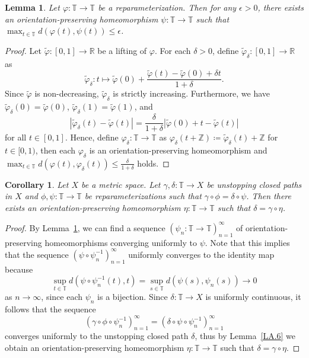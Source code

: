 \documentclass[reqno,centertags,12pt]{amsart}
\newtheorem{lemma}[theorem]{Lemma}
\newtheorem{corollary}[theorem]{Corollary}
\theoremstyle{definition}
\numberwithin{equation}{section}
\newcommand{\abs}[1]{\left\lvert#1\right\rvert}
\newcommand{\seq}[1]{\left( #1 \right)}
\newcommand{\bbR}{{\mathbb{R}}}
\newcommand{\bbZ}{{\mathbb{Z}}}
\newcommand{\bbT}{{\mathbb{T}}}
\begin{document}
\begin{lemma}\label{LA.7}
	Let $\varphi\colon\bbT\to\bbT$ be a reparameterization. Then for any $\epsilon>0$,
	there exists an orientation-preserving homeomorphism $\psi\colon\bbT\to\bbT$
	such that $\max_{t\in\bbT}d(\varphi(t),\psi(t))\leq\epsilon$.
\end{lemma}

\begin{proof}
	Let $\tilde{\varphi}\colon[0,1]\to\bbR$ be a lifting of $\varphi$.
	For each $\delta>0$, define $\tilde{\varphi}_{\delta}\colon[0,1]\to\bbR$ as
	\[
		\tilde{\varphi}_{\delta}\colon t\mapsto
		\tilde{\varphi}(0) +
		\frac{\tilde{\varphi}(t) - \tilde{\varphi}(0) + \delta t}{1+\delta}.
	\]
	Since $\tilde{\varphi}$ is non-decreasing, $\tilde{\varphi}_{\delta}$ is strictly increasing.
	Furthermore, we have $\tilde{\varphi}_{\delta}(0) = \tilde{\varphi}(0)$,
	$\tilde{\varphi}_{\delta}(1) = \tilde{\varphi}(1)$, and
	\[
		\abs{\tilde{\varphi}_{\delta}(t) - \tilde{\varphi}(t)}
		= \frac{\delta}{1+\delta}\abs{\tilde{\varphi}(0) + t - \tilde{\varphi}(t)}
	\]
	for all $t\in[0,1]$. Hence, define $\varphi_{\delta}\colon\bbT\to\bbT$ as
	$\varphi_{\delta}(t+\bbZ)\coloneqq\tilde{\varphi}_{\delta}(t)+\bbZ$ for $t\in[0,1)$, then
	each $\varphi_{\delta}$ is an orientation-preserving homeomorphism and
	$\max_{t\in\bbT}d(\varphi(t),\varphi_{\delta}(t)) \leq \frac{\delta}{1+\delta}$ holds.
\end{proof}

\begin{corollary}\label{CA.8}
	Let $X$ be a metric space. Let $\gamma,\delta\colon\bbT\to X$ be
	unstopping closed paths in $X$ and $\phi,\psi\colon\bbT\to\bbT$ be
	reparameterizations such that $\gamma\circ\phi = \delta\circ\psi$. Then there exists an
	orientation-preserving homeomorphism $\eta\colon\bbT\to\bbT$ such that
    $\delta=\gamma\circ\eta$.
\end{corollary}

\begin{proof}
	By Lemma~\ref{LA.7}, we can find a
	sequence $\seq{\psi_{n}\colon\bbT\to\bbT}_{n=1}^{\infty}$ of
	orientation-preserving homeomorphisms converging uniformly to $\psi$.
	Note that this implies that the sequence $\seq{\psi\circ\psi_{n}^{-1}}_{n=1}^{\infty}$
	uniformly converges to the identity map because
	\[
		\sup_{t\in\bbT}d(\psi\circ\psi_{n}^{-1}(t),t)
		=\sup_{s\in\bbT}d(\psi(s),\psi_{n}(s)) \to 0
	\]
	as $n\to\infty$, since each $\psi_{n}$ is a bijection.
	Since $\delta\colon\bbT\to X$ is uniformly continuous, it follows that the sequence
	\[
		\seq{\gamma\circ\phi\circ\psi_{n}^{-1}}_{n=1}^{\infty}
		= \seq{\delta\circ\psi\circ\psi_{n}^{-1}}_{n=1}^{\infty}
	\]
	converges uniformly to the unstopping closed path $\delta$, thus by
	Lemma~\ref{LA.6}
	we obtain an orientation-preserving homeomorphism $\eta\colon\bbT\to\bbT$
	such that $\delta = \gamma\circ\eta$.
\end{proof}
\end{document}
